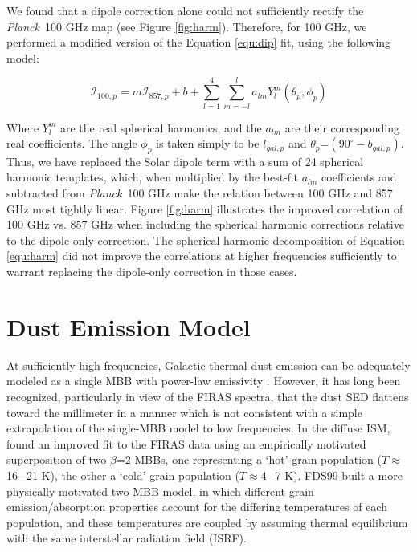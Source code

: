 \documentclass{emulateapj}
\newcommand{\PLANCK}{{\it Planck}}
\begin{document}
We found that a dipole correction alone could not sufficiently rectify the 
\PLANCK~100 GHz map (see Figure \ref{fig:harm}). Therefore, for 100 GHz, we 
performed a modified version of the Equation \ref{equ:dip} fit, using the 
following model:

\begin{equation} \label{equ:harm}
\mathcal{I}_{100, p} = m\mathcal{I}_{857, p} + b + \sum_{l=1}^{4} \sum_{m=-l}^{l} a_{lm}Y_{l}^{m}(\theta_p, \phi_p)
\end{equation}

Where $Y_{l}^{m}$ are the real spherical harmonics, and the $a_{lm}$ are their 
corresponding real coefficients. The angle $\phi_p$ is taken simply to be 
$l_{gal, p}$ and $\theta_p$=$(90^{\circ}-b_{gal, p})$. Thus, we have replaced 
the Solar dipole term with a sum of 24 spherical harmonic templates, which, 
when multiplied by the best-fit $a_{lm}$ coefficients and subtracted from 
\PLANCK~100 GHz make the relation between 100 GHz and 857 GHz most tightly 
linear. Figure \ref{fig:harm} illustrates the improved correlation of 100 GHz 
vs. 857 GHz when including the spherical harmonic corrections relative to the 
dipole-only correction. The spherical harmonic decomposition of Equation 
\ref{equ:harm} did not improve the correlations at higher frequencies 
sufficiently to warrant replacing the dipole-only correction in those cases.


\section{Dust Emission Model}
\label{sec:modeling}


At sufficiently high frequencies, Galactic thermal dust emission can be 
adequately modeled as a single MBB with power-law emissivity 
\citep[e.g. SFD;][]{planckdust}. However, it has long been recognized, 
particularly in view of the FIRAS spectra, that the dust SED flattens toward 
the millimeter in a manner which is not consistent with a simple extrapolation 
of the single-MBB model to low frequencies. In the diffuse ISM, \cite{reach95} 
found an improved fit to the FIRAS data using an empirically motivated 
superposition of two $\beta$=2 MBBs, one representing a `hot' grain population 
($T$$\approx$16$-$21 K), the other a `cold' grain population 
($T$$\approx$4$-$7 K). FDS99 built a more physically motivated two-MBB model, 
in which different grain emission/absorption properties account for the 
differing temperatures of each population, and these temperatures are coupled 
by assuming thermal equilibrium with the same interstellar radiation field 
(ISRF).
\end{document}
